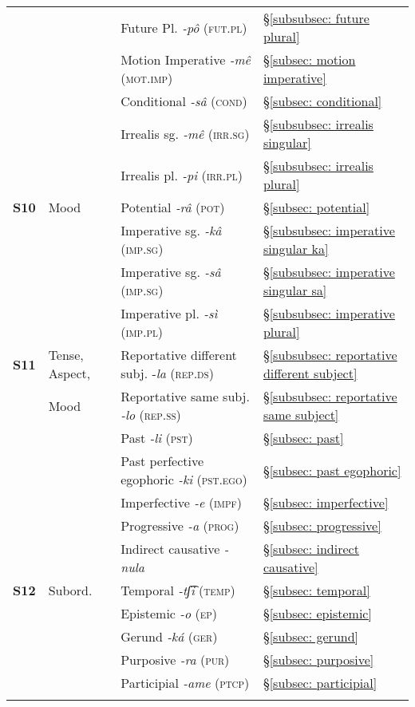 \begin{table}
\begin{tabularx}{\textwidth}{lp{}Ql}
&  & Future Pl.  \textit{-pô} (\textsc{fut.pl}) & §\ref{subsubsec: future plural}\\
&  & Motion Imperative  \textit{-mê} (\textsc{mot.imp}) & §\ref{subsec: motion imperative}\\
&  & Conditional  \textit{-sâ} (\textsc{cond}) & §\ref{subsec: conditional}\\
&  & Irrealis sg.  \textit{-mê} (\textsc{irr.sg}) & §\ref{subsubsec: irrealis singular}\\
&  & Irrealis pl.  \textit{-pi} (\textsc{irr.pl}) & §\ref{subsubsec: irrealis plural}\\
 \textbf{S10} & Mood & Potential  \textit{-râ} (\textsc{pot}) & §\ref{subsec: potential}\\
&  & Imperative sg.  \textit{-kâ} (\textsc{imp.sg})  & §\ref{subsubsec: imperative singular ka}\\
&  & Imperative sg.  \textit{-sâ} (\textsc{imp.sg})  & §\ref{subsubsec: imperative singular sa}\\
&  & Imperative pl.  \textit{-sì} (\textsc{imp.pl}) & §\ref{subsubsec: imperative plural}\\
 \textbf{S11} & Tense, Aspect, & Reportative different subj.  -\textit{la} (\textsc{rep.ds}) & §\ref{subsubsec: reportative different subject}\\
& Mood & { Reportative same subj. \textit{-lo} (\textsc{rep.ss})} & §\ref{subsubsec: reportative same subject}\\
&  & Past \textit{-li} (\textsc{pst}) &  §\ref{subsec: past}\\
&  & Past perfective egophoric \textit{-ki} (\textsc{pst.ego}) & §\ref{subsec: past egophoric}\\
&  & Imperfective  \textit{-e} (\textsc{impf}) & §\ref{subsec: imperfective}\\
&  & Progressive  \textit{-a} (\textsc{prog}) & §\ref{subsec: progressive}\\
&  & Indirect causative  \textit{-nula}  & §\ref{subsec: indirect causative}\\
 \textbf{S12} & Subord. & Temporal  \textit{{}-tʃ͡i} (\textsc{temp}) & §\ref{subsec: temporal}\\
&  & Epistemic  \textit{-o} (\textsc{ep}) & §\ref{subsec: epistemic}\\
&  & Gerund  \textit{-ká} (\textsc{ger}) & §\ref{subsec: gerund}\\
&  & Purposive  \textit{-ra} (\textsc{pur}) & §\ref{subsec: purposive}\\
&  & Participial  \textit{-ame} (\textsc{ptcp}) & §\ref{subsec: participial}\\
\lspbottomrule
\end{tabularx}
\end{table}

